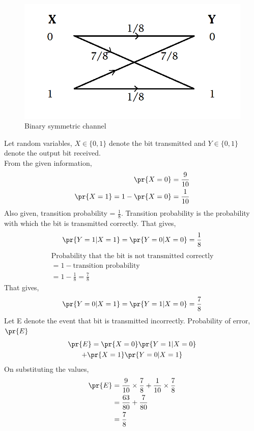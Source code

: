 
\begin{figure}[h!]
\centering
\includegraphics[width=\columnwidth]{solutions/24/Figure.png}
\caption{Binary symmetric channel}
\label{fig:BSC}
\end{figure}

Let random variables, $X \in \{0,1\}$ denote the bit transmitted and $Y \in \{0,1\}$ denote the output bit received.
\\From the given information, 
\begin{align}
    \pr{X=0} = \frac{9}{10}\\
    \pr{X=1} = 1-\pr{X=0} = \frac{1}{10}
\end{align}
Also given, transition probability = $\frac{1}{8}$. Transition probability is the probability with which the bit is transmitted correctly. That gives, 
\begin{align}
    \pr{Y=1|X=1}=\pr{Y=0|X=0}=\frac{1}{8}
\end{align}
\begin{multline}
\text{Probability that the bit is not transmitted correctly}  \\
= 1-\text{transition probability}\\
= 1-\frac{1}{8} = \frac{7}{8}
\end{multline}
That gives,
\begin{align}
    \pr{Y=0|X=1}=\pr{Y=1|X=0}=\frac{7}{8}
\end{align}
Let E denote the event that bit is transmitted incorrectly. Probability of error, $\pr{E}$
\begin{multline}
    \pr{E} = \pr{X=0}\pr{Y=1|X=0}\\ + \pr{X=1}\pr{Y=0|X=1}
\end{multline}
On substituting the values,
\begin{align}
    \pr{E} & = \frac{9}{10}\times\frac{7}{8} + \frac{1}{10}\times\frac{7}{8} \\
    & = \frac{63}{80} + \frac{7}{80}\\
    & = \frac{7}{8}
\end{align}



